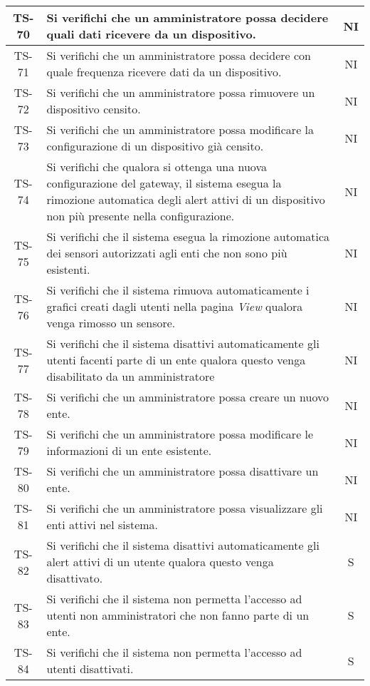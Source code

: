 \begin{center}
\begin{longtable}{|c|p{10cm}|c|}
			 \hline
			 TS-70 & Si verifichi che un amministratore possa decidere quali dati ricevere da un dispositivo. & NI \\
			 \hline
			 TS-71 & Si verifichi che un amministratore possa decidere con quale frequenza ricevere dati da un dispositivo. & NI \\
			 \hline
			 TS-72 & Si verifichi che un amministratore possa rimuovere un dispositivo censito. & NI \\
			 \hline
			 TS-73 & Si verifichi che un amministratore possa modificare la configurazione di un dispositivo già censito. & NI \\
			 \hline
			 TS-74 & Si verifichi che qualora si ottenga una nuova configurazione del gateway, il sistema esegua la rimozione automatica degli alert attivi di un dispositivo non più presente nella configurazione. & NI \\
			 \hline
			 TS-75 & Si verifichi che il sistema esegua la rimozione automatica dei sensori autorizzati agli enti che non sono più esistenti. & NI \\
			 \hline
			 TS-76 & Si verifichi che il sistema rimuova automaticamente i grafici creati dagli utenti nella pagina \textit{View} qualora venga rimosso un sensore. & NI \\
			 \hline
			 TS-77 & Si verifichi che il sistema disattivi automaticamente gli utenti facenti parte di un ente qualora questo venga disabilitato da un amministratore & NI \\
			 \hline
			 TS-78 & Si verifichi che un amministratore possa creare un nuovo ente. & NI \\
			 \hline
			 TS-79 & Si verifichi che un amministratore possa modificare le informazioni di un ente esistente. & NI \\
			 \hline
			 TS-80 & Si verifichi che un amministratore possa disattivare un ente. & NI \\
			 \hline
			 TS-81 & Si verifichi che un amministratore possa visualizzare gli enti attivi nel sistema. & NI \\
			 \hline
			 TS-82 & Si verifichi che il sistema disattivi automaticamente gli alert attivi di un utente qualora questo venga disattivato. & S \\
			 \hline
			 TS-83 & Si verifichi che il sistema non permetta l'accesso ad utenti non amministratori che non fanno parte di un ente. & S \\
			 \hline
			 TS-84 & Si verifichi che il sistema non permetta l'accesso ad utenti disattivati. & S \\

\end{longtable}
\end{center}
